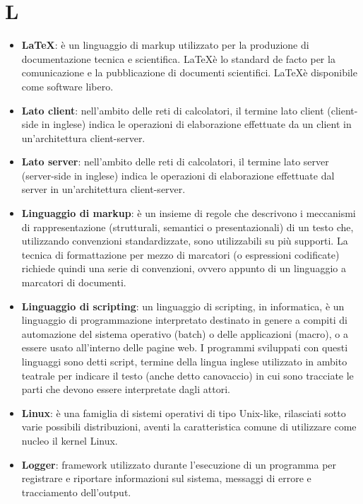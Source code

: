 \section{L}
\begin{itemize} 
	\item
	\textbf{\LaTeX}: è un linguaggio di markup utilizzato per la produzione di documentazione tecnica e scientifica. \LaTeX è lo standard de facto per la comunicazione e la pubblicazione di documenti scientifici. \LaTeX è disponibile come software libero.
	\item
	\textbf{Lato client}: nell'ambito delle reti di calcolatori, il termine lato client (client-side in inglese) indica le operazioni di elaborazione effettuate da un client in un'architettura client-server.
	\item
	\textbf{Lato server}: nell'ambito delle reti di calcolatori, il termine lato server (server-side in inglese) indica le operazioni di elaborazione effettuate dal server in un'architettura client-server.
	\item
	\textbf{Linguaggio di markup}: è un insieme di regole che descrivono i meccanismi di rappresentazione (strutturali, semantici o presentazionali) di un testo che, utilizzando convenzioni standardizzate, sono utilizzabili su più supporti. La tecnica di formattazione per mezzo di marcatori (o espressioni codificate) richiede quindi una serie di convenzioni, ovvero appunto di un linguaggio a marcatori di documenti.
	\item
	\textbf{Linguaggio di scripting}: un linguaggio di scripting, in informatica, è un linguaggio di programmazione interpretato destinato in genere a compiti di automazione del sistema operativo (batch) o delle applicazioni (macro), o a essere usato all'interno delle pagine web.
	I programmi sviluppati con questi linguaggi sono detti script, termine della lingua inglese utilizzato in ambito teatrale per indicare il testo (anche detto canovaccio) in cui sono tracciate le parti che devono essere interpretate dagli attori.
	\item
	\textbf{Linux}: è una famiglia di sistemi operativi di tipo Unix-like, rilasciati sotto varie possibili distribuzioni, aventi la caratteristica comune di utilizzare come nucleo il kernel Linux.
	\item
	\textbf{Logger}: framework utilizzato durante l'esecuzione di un programma per registrare e riportare informazioni sul sistema, messaggi di errore e tracciamento dell'output.
\end{itemize}